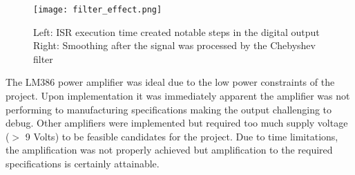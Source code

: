 \begin{figure}[h]
  \centering
  \texttt{[image: filter\_effect.png]}
  \caption{Left: ISR execution time created notable steps in the digital output 
		Right: Smoothing after the signal was processed by the Chebyshev filter}
  \label{fig:filter_effect}
\end{figure}

The LM386 power amplifier was ideal due to the low power constraints of the project. Upon implementation it was immediately apparent the amplifier was not performing to manufacturing specifications making the output challenging to debug. Other amplifiers were implemented but required too much supply voltage ($>$ 9 Volts) to be feasible candidates for the project.  Due to time limitations, the amplification was not properly achieved but amplification to the required specifications is certainly attainable. 

